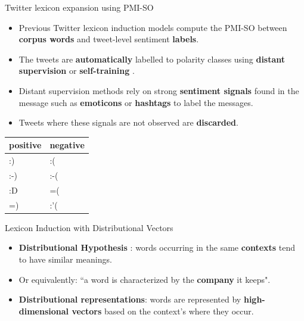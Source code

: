 \begin{frame}{Twitter lexicon expansion using PMI-SO}
\begin{scriptsize}
\begin{itemize}
\item Previous Twitter lexicon induction models compute the PMI-SO between \textbf{corpus words} and tweet-level sentiment \textbf{labels}. 
\item The tweets are \textbf{automatically} labelled to polarity classes using \textbf{distant supervision} \cite{Mohammad2013, Zhou2014} or \textbf{self-training} \cite{avaya2013}. 
\item  Distant supervision methods rely on strong \textbf{sentiment signals} found in the message such as \textbf{emoticons} \cite{Mohammad2013, Zhou2014} or \textbf{hashtags}  \cite{Mohammad2013} to label the messages.
\item  Tweets where these signals are not observed are \textbf{discarded}. 
\end{itemize}

\begin{table}[htbp]
\centering
\begin{tabular}{|l|l|}
\hline
positive & negative \\ \hline
:) & :( \\ 
:-) & :-( \\ 
:D & =( \\ 
=) & :'(   \\ \hline
\end{tabular}
\end{table} 


\end{scriptsize}
\end{frame}


\begin{frame}{Lexicon Induction with Distributional Vectors}
\begin{scriptsize}
\begin{itemize}
\item \textbf{Distributional Hypothesis} \cite{harris1954}: words occurring in the same \textbf{contexts} tend to have similar meanings.
\item Or equivalently: ``a word is characterized by the \textbf{company} it keeps".
\item \textbf{Distributional representations}: words are represented by \textbf{high-dimensional vectors} based on the context's where they occur. 

\end{itemize}
\end{scriptsize}
\end{frame}

